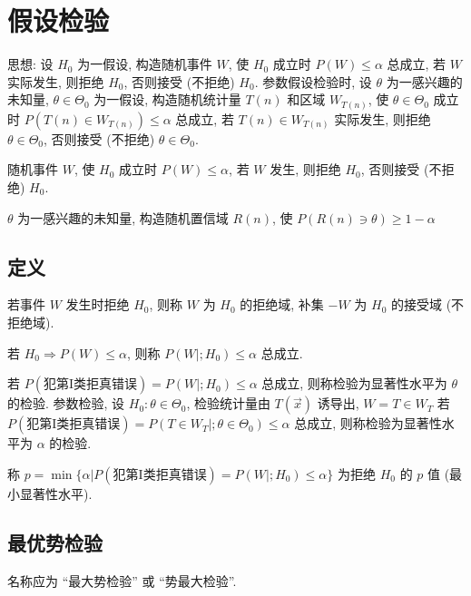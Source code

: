 \chapter{假设检验}

思想: 设 $H_0$ 为一假设, 构造随机事件 $W$, 使 $H_0$ 成立时 $P(W)\le\alpha$ 总成立, 若 $W$ 实际发生, 则拒绝 $H_0$, 否则接受 (不拒绝) $H_0$. 参数假设检验时, 设 $\theta$ 为一感兴趣的未知量, $\theta\in\Theta_0$ 为一假设, 构造随机统计量 $T(n)$ 和区域 $W_{T(n)}$, 使 $\theta\in\Theta_0$ 成立时 $P(T(n)\in W_{T(n)})\le\alpha$ 总成立, 若 $T(n)\in W_{T(n)}$ 实际发生, 则拒绝 $\theta\in\Theta_0$, 否则接受 (不拒绝) $\theta\in\Theta_0$.

随机事件 $W$, 使 $H_0$ 成立时 $P(W)\le\alpha$, 若 $W$ 发生, 则拒绝 $H_0$, 否则接受 (不拒绝) $H_0$.

$\theta$ 为一感兴趣的未知量, 构造随机置信域 $R(n)$, 使 $P(R(n)\ni \theta)\ge1-\alpha$

\section{定义}

若事件 $W$ 发生时拒绝 $H_0$, 则称 $W$ 为 $H_0$ 的拒绝域, 补集 $-W$ 为 $H_0$ 的接受域 (不拒绝域).

若 $H_0\Rightarrow P(W)\le\alpha$, 则称 $P(W|;H_0)\le\alpha$ 总成立.

若 $P(\text{犯第I类拒真错误})=P(W|;H_0)\le\alpha$ 总成立, 则称检验为显著性水平为 $\theta$ 的检验. 参数检验, 设 $H_0:\theta\in\Theta_0$, 检验统计量由 $T(\vec{x})$ 诱导出, $W=T\in W_T$ 若 $P(\text{犯第I类拒真错误})=P(T\in W_T|;\theta\in\Theta_0)\le\alpha$ 总成立, 则称检验为显著性水平为 $\alpha$ 的检验.

称 $p=\min\{\alpha|P(\text{犯第I类拒真错误})=P(W|;H_0)\le\alpha\}$ 为拒绝 $H_0$ 的 $p$ 值 (最小显著性水平).

\section{最优势检验}

名称应为 ``最大势检验'' 或 ``势最大检验''.
